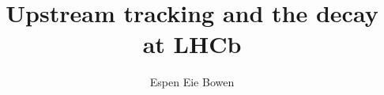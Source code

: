 \documentclass[12pt,a4paper]{article}
\numberwithin{equation}{section}
\begin{document}

\title{\bf Upstream tracking and the decay  at LHCb}
\author{Espen Eie Bowen}

\maketitle
\clearpage\mbox{}\clearpage%

\setcounter{page}{3}


\clearpage

\clearpage
\begingroup
\hypersetup{linkcolor=black}
\tableofcontents
\endgroup
\clearpage

\linenumbers%


\clearpage

\clearpage

\clearpage

\clearpage

\clearpage

\clearpage

\clearpage


\clearpage

\renewcommand{\refname}{Bibliography}

\end{document}
